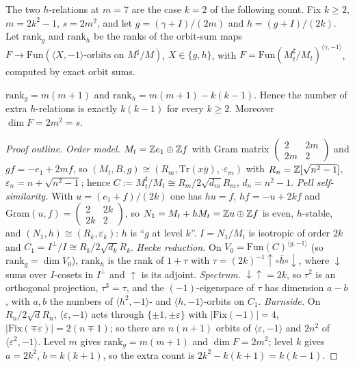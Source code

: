 The two $h$-relations at $m=7$ are the case $k=2$ of the following count. Fix $k\ge2$, $m=2k^2-1$, $s=2m^2$, and let $g=(\gamma+I)/(2m)$ and
$h=(g+I)/(2k)$. Let $\mathrm{rank}_g$ and $\mathrm{rank}_h$ be the ranks of the orbit-sum maps $F\to\mathrm{Fun}(\langle X,-1\rangle\text{-orbits on }M^\sharp/M)$,
$X\in\{g,h\}$, with $F=\mathrm{Fun}(M_t^\sharp/M_t)^{\langle\gamma,-1\rangle}$, computed by exact orbit sums.
\begin{proposition}[K1]\label{prop:K1}
$\mathrm{rank}_g=m(m+1)$ and $\mathrm{rank}_h=m(m+1)-k(k-1)$. Hence the number of extra $h$-relations is exactly $k(k-1)$ for every $k\ge2$. Moreover $\dim F=2m^2=s$.
\end{proposition}
\begin{proof}[Proof outline]
\emph{Order model.} $M_t=\mathbb{Z} e_1\oplus\mathbb{Z} f$ with Gram matrix $\left(\begin{smallmatrix}2&2m\\2m&2\end{smallmatrix}\right)$ and $gf=-e_1+2mf$, so $(M_t,B,g)\cong(R_m,\mathrm{Tr}(x\bar y),\cdot\varepsilon_m)$ with $R_n=\mathbb{Z}[\sqrt{n^2-1}]$, $\varepsilon_n=n+\sqrt{n^2-1}$; hence $C:=M_t^\sharp/M_t\cong R_m/2\sqrt{d_m}R_m$, $d_n=n^2-1$.
\emph{Pell self-similarity.} With $u=(e_1+f)/(2k)$ one has $hu=f$, $hf=-u+2kf$ and $\mathrm{Gram}(u,f)=\left(\begin{smallmatrix}2&2k\\2k&2\end{smallmatrix}\right)$, so $N_1=M_t+hM_t=\mathbb{Z} u\oplus\mathbb{Z} f$ is even, $h$-stable, and $(N_1,h)\cong(R_k,\varepsilon_k)$: $h$ is ``$g$ at level $k$''. $I=N_1/M_t$ is isotropic of order $2k$ and $C_1=I^\perp/I\cong R_k/2\sqrt{d_k}R_k$.
\emph{Hecke reduction.} On $V_0=\mathrm{Fun}(C)^{\langle g,-1\rangle}$ (so $\mathrm{rank}_g=\dim V_0$), $\mathrm{rank}_h$ is the rank of $1+\tau$ with $\tau=(2k)^{-1}\uparrow\circ\bar h\circ\downarrow$, where $\downarrow$ sums over $I$-cosets in $I^\perp$ and $\uparrow$ is its adjoint.
\emph{Spectrum.} $\downarrow\uparrow=2k$, so $\tau^2$ is an orthogonal projection, $\tau^3=\tau$, and the $(-1)$-eigenspace of $\tau$ has dimension $a-b$, with $a,b$ the numbers of $\langle h^2,-1\rangle$- and $\langle h,-1\rangle$-orbits on $C_1$.
\emph{Burnside.} On $R_n/2\sqrt dR_n$, $\langle\varepsilon,-1\rangle$ acts through $\{\pm1,\pm\varepsilon\}$ with $|\mathrm{Fix}(-1)|=4$, $|\mathrm{Fix}(\mp\varepsilon)|=2(n\mp1)$; so there are $n(n+1)$ orbits of $\langle\varepsilon,-1\rangle$ and $2n^2$ of $\langle\varepsilon^2,-1\rangle$. Level $m$ gives $\mathrm{rank}_g=m(m+1)$ and $\dim F=2m^2$; level $k$ gives $a=2k^2$, $b=k(k+1)$, so the extra count is $2k^2-k(k+1)=k(k-1)$.
\end{proof}
